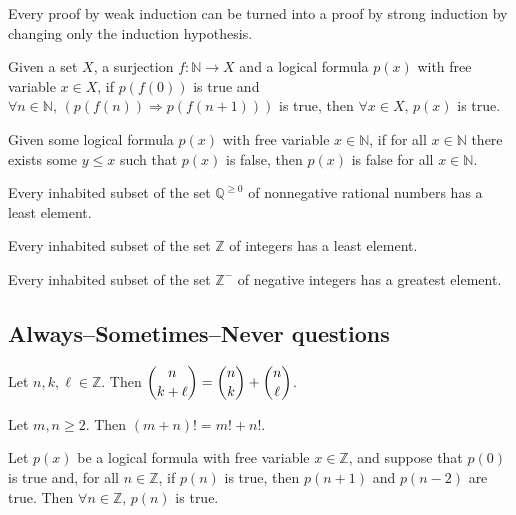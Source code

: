 \begin{chapex} %
Every proof by weak induction can be turned into a proof by strong induction by changing only the induction hypothesis.
\end{chapex}

\begin{chapex} %
Given a set $X$, a surjection $f : \mathbb{N} \to X$ and a logical formula $p(x)$ with free variable $x \in X$, if $p(f(0))$ is true and $\forall n \in \mathbb{N},\, (p(f(n)) \Rightarrow p(f(n+1)))$ is true, then $\forall x \in X,\, p(x)$ is true.
\end{chapex}

\begin{chapex} %
Given some logical formula $p(x)$ with free variable $x \in \mathbb{N}$, if for all $x \in \mathbb{N}$ there exists some $y \le x$ such that $p(x)$ is false, then $p(x)$ is false for all $x \in \mathbb{N}$.
\end{chapex}

\begin{chapex} %
Every inhabited subset of the set $\mathbb{Q}^{\ge 0}$ of nonnegative rational numbers has a least element. 
\end{chapex}

\begin{chapex} %
Every inhabited subset of the set $\mathbb{Z}$ of integers has a least element.
\end{chapex}

\begin{chapex} %
\label{cqInductionTFEnd}
Every inhabited subset of the set $\mathbb{Z}^{-}$ of negative integers has a greatest element.
\end{chapex}

\subsection*{Always--Sometimes--Never questions}


\begin{chapex} %
\label{cqInductionASNBegin}
Let $n,k,\ell \in \mathbb{Z}$. Then $\dbinom{n}{k+\ell} = \dbinom{n}{k} + \dbinom{n}{\ell}$.
\end{chapex}

\begin{chapex} %
Let $m,n \ge 2$. Then $(m+n)! = m!+n!$.
\end{chapex}

\begin{chapex} %
\label{cqInductionASNEnd}
Let $p(x)$ be a logical formula with free variable $x \in \mathbb{Z}$, and suppose that $p(0)$ is true and, for all $n \in \mathbb{Z}$, if $p(n)$ is true, then $p(n+1)$ and $p(n-2)$ are true. Then $\forall n \in \mathbb{Z},\, p(n)$ is true.
\end{chapex}